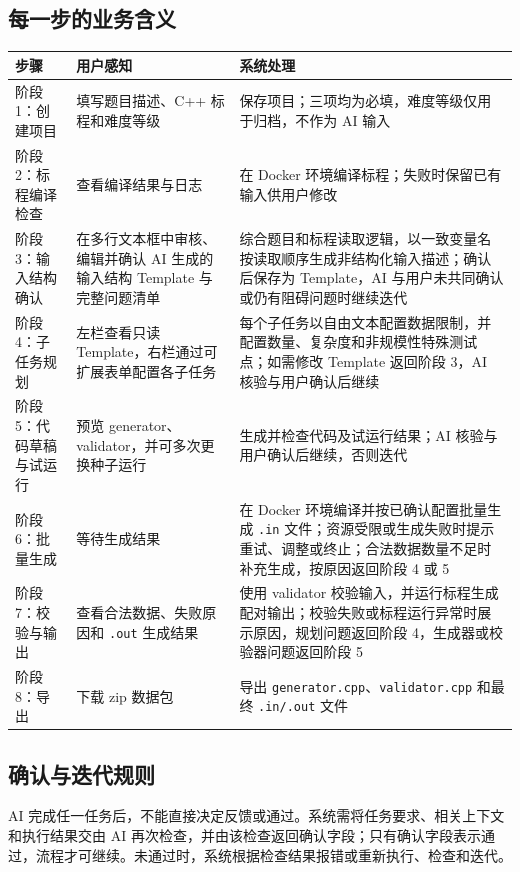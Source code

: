 \documentclass[UTF8,zihao=-4]{ctexart}
\begin{document}
\subsection{每一步的业务含义}

\begin{longtable}{p{3.2cm}p{6.2cm}p{4.4cm}}
\toprule
步骤 & 用户感知 & 系统处理 \\
\midrule
阶段 1：创建项目 & 填写题目描述、C++ 标程和难度等级 & 保存项目；三项均为必填，难度等级仅用于归档，不作为 AI 输入 \\
阶段 2：标程编译检查 & 查看编译结果与日志 & 在 Docker 环境编译标程；失败时保留已有输入供用户修改 \\
阶段 3：输入结构确认 & 在多行文本框中审核、编辑并确认 AI 生成的输入结构 Template 与完整问题清单 & 综合题目和标程读取逻辑，以一致变量名按读取顺序生成非结构化输入描述；确认后保存为 Template，AI 与用户未共同确认或仍有阻碍问题时继续迭代 \\
阶段 4：子任务规划 & 左栏查看只读 Template，右栏通过可扩展表单配置各子任务 & 每个子任务以自由文本配置数据限制，并配置数量、复杂度和非规模性特殊测试点；如需修改 Template 返回阶段 3，AI 核验与用户确认后继续 \\
阶段 5：代码草稿与试运行 & 预览 generator、validator，并可多次更换种子运行 & 生成并检查代码及试运行结果；AI 核验与用户确认后继续，否则迭代 \\
阶段 6：批量生成 & 等待生成结果 & 在 Docker 环境编译并按已确认配置批量生成 \texttt{.in} 文件；资源受限或生成失败时提示重试、调整或终止；合法数据数量不足时补充生成，按原因返回阶段 4 或 5 \\
阶段 7：校验与输出 & 查看合法数据、失败原因和 \texttt{.out} 生成结果 & 使用 validator 校验输入，并运行标程生成配对输出；校验失败或标程运行异常时展示原因，规划问题返回阶段 4，生成器或校验器问题返回阶段 5 \\
阶段 8：导出 & 下载 zip 数据包 & 导出 \texttt{generator.cpp}、\texttt{validator.cpp} 和最终 \texttt{.in/.out} 文件 \\
\bottomrule
\end{longtable}

\subsection{确认与迭代规则}

AI 完成任一任务后，不能直接决定反馈或通过。系统需将任务要求、相关上下文和执行结果交由 AI 再次检查，并由该检查返回确认字段；只有确认字段表示通过，流程才可继续。未通过时，系统根据检查结果报错或重新执行、检查和迭代。
\end{document}
